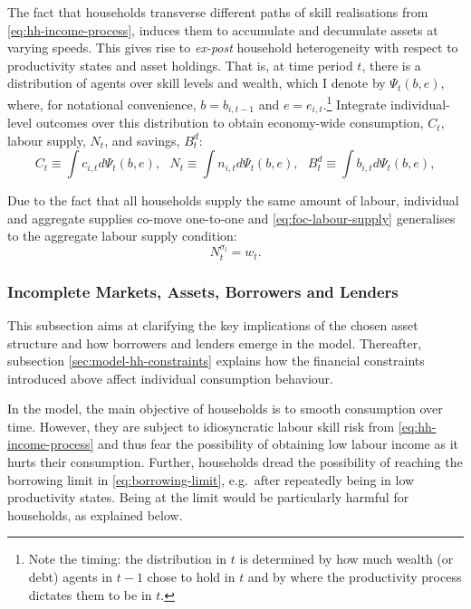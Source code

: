 \documentclass[a4paper,12pt]{article} %
\numberwithin{equation}{section} %
\numberwithin{figure}{section}
\numberwithin{table}{section}
\begin{document}
The fact that households transverse different paths of skill realisations from \eqref{eq:hh-income-process}, induces them to accumulate and decumulate assets at varying speeds. This gives rise to \textit{ex-post} household heterogeneity with respect to productivity states and asset holdings. That is, at time period $t$, there is a distribution of agents over skill levels and wealth, which I denote by $\Psi_t (b,e)$, where, for notational convenience, $b=b_{i,t-1}$ and $e=e_{i,t}$.\footnote{Note the timing: the distribution in $t$ is determined by how much wealth (or debt) agents in $t-1$ chose to hold in $t$ and by where the productivity process dictates them to be in $t$.} Integrate individual-level outcomes over this distribution to obtain economy-wide consumption, $C_t$, labour supply, $N_t$, and savings, $B_t^d$:
\begin{equation*}
    C_t \equiv \int c_{i,t} d \Psi_t (b,e), \ \ \ N_t \equiv \int n_{i,t} d \Psi_t (b,e), \ \ \ B_t^d \equiv \int b_{i,t} d \Psi_t (b,e),
\end{equation*}

Due to the fact that all households supply the same amount of labour, individual and aggregate supplies co-move one-to-one and \eqref{eq:foc-labour-supply} generalises to the aggregate labour supply condition:
\begin{equation}
    N_t^{\sigma_l} = w_t. \label{eq:hh-agg-labour-supply}
\end{equation}

\subsubsection{Incomplete Markets, Assets, Borrowers and Lenders}
\label{sec:model-hh-assets}

This subsection aims at clarifying the key implications of the chosen asset structure and how borrowers and lenders emerge in the model. Thereafter, subsection \ref{sec:model-hh-constraints} explains how the financial constraints introduced above affect individual consumption behaviour. 

In the model, the main objective of households is to smooth consumption over time. However, they are subject to idiosyncratic labour skill risk from \eqref{eq:hh-income-process} and thus fear the possibility of obtaining low labour income as it hurts their consumption. Further, households dread the possibility of reaching the borrowing limit in \eqref{eq:borrowing-limit}, e.g.~after repeatedly being in low productivity states. Being at the limit would be particularly harmful for households, as explained below.
\end{document}
